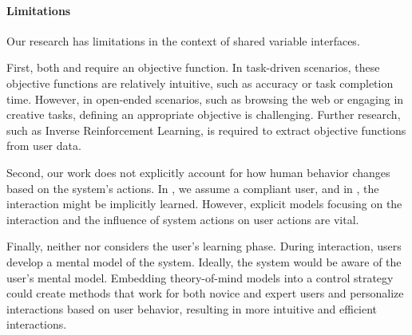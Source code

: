 \paragraph{Limitations}
Our research has limitations in the context of shared variable interfaces.

First, both \magpen and \marlui require an objective function. In task-driven scenarios, these objective functions are relatively intuitive, such as accuracy or task completion time. However, in open-ended scenarios, such as browsing the web or engaging in creative tasks, defining an appropriate objective is challenging. Further research, such as Inverse Reinforcement Learning, is required to extract objective functions from user data.

Second, our work does not explicitly account for how human behavior changes based on the system's actions. In \magpen, we assume a compliant user, and in \marlui, the interaction might be implicitly learned. However, explicit models focusing on the interaction and the influence of system actions on user actions are vital.

Finally, neither \magpen nor \marlui considers the user's learning phase. During interaction, users develop a mental model of the system. Ideally, the system would be aware of the user's mental model. Embedding theory-of-mind models into a control strategy could create methods that work for both novice and expert users and personalize interactions based on user behavior, resulting in more intuitive and efficient interactions.